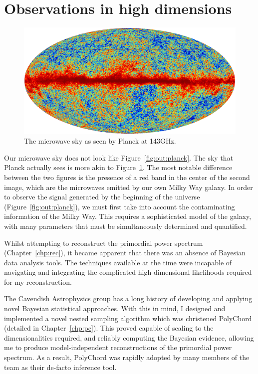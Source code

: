 \section{Observations in high dimensions}
\begin{figure}[tp]
  \includegraphics[width=\textwidth]{chapters/outline/figures/planck_galaxy}
  \caption{The microwave sky as seen by Planck at 143GHz.}\label{fig:out:planck_galaxy}
\end{figure}
Our microwave sky does not look like Figure~\ref{fig:out:planck}. The sky that Planck actually sees is more akin to Figure~\ref{fig:out:planck_galaxy}. The most notable difference between the two figures is the presence of a red band in the center of the second image, which are the microwaves emitted by our own Milky Way galaxy. In order to observe the signal generated by the beginning of the universe (Figure~\ref{fig:out:planck}), we must first take into account the contaminating information of the Milky Way. This requires a sophisticated model of the galaxy, with many parameters that must be simultaneously determined and quantified. 

Whilst attempting to reconstruct the primordial power spectrum (Chapter~\ref{chp:rec}), it became apparent that there was an absence of Bayesian data analysis tools. The techniques available at the time were incapable of navigating and integrating the complicated high-dimensional likelihoods required for my reconstruction.

The Cavendish Astrophysics group has a long history of developing and applying novel Bayesian statistical approaches. With this in mind, I designed and implemented a novel nested sampling algorithm which was christened PolyChord (detailed in Chapter~\ref{chp:pc}). This proved capable of scaling to the dimensionalities required, and reliably computing  the Bayesian evidence, allowing me to produce model-independent reconstructions of the primordial power spectrum.
As a result, PolyChord was rapidly adopted by many members of the team as their de-facto inference tool.

